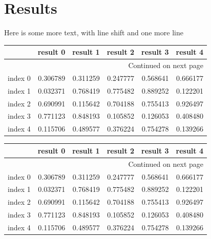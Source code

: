 \documentclass[a4paper]{article}%
\begin{document}
\section{Results}%
\label{sec:Results}%
Here is some more text, \newline%
with line shift\newline%
\newline%
and one more line%
\begin{table}[H]%
\begin{longtable}{lrrrrr}
\toprule
{} &  result 0 &  result 1 &  result 2 &  result 3 &  result 4 \\
\midrule
\endhead
\midrule
\multicolumn{6}{r}{{Continued on next page}} \\
\midrule
\endfoot

\bottomrule
\endlastfoot
index 0 &  0.306789 &  0.311259 &  0.247777 &  0.568641 &  0.666177 \\
index 1 &  0.032371 &  0.768419 &  0.775482 &  0.889252 &  0.122201 \\
index 2 &  0.690991 &  0.115642 &  0.704188 &  0.755413 &  0.926497 \\
index 3 &  0.771123 &  0.848193 &  0.105852 &  0.126053 &  0.408480 \\
index 4 &  0.115706 &  0.489577 &  0.376224 &  0.754278 &  0.139266 \\
\end{longtable}
%
\end{table}%
\begin{table}[H]%
\begin{longtable}{lrrrrr}
\toprule
{} &  result 0 &  result 1 &  result 2 &  result 3 &  result 4 \\
\midrule
\endhead
\midrule
\multicolumn{6}{r}{{Continued on next page}} \\
\midrule
\endfoot

\bottomrule
\endlastfoot
index 0 &  0.306789 &  0.311259 &  0.247777 &  0.568641 &  0.666177 \\
index 1 &  0.032371 &  0.768419 &  0.775482 &  0.889252 &  0.122201 \\
index 2 &  0.690991 &  0.115642 &  0.704188 &  0.755413 &  0.926497 \\
index 3 &  0.771123 &  0.848193 &  0.105852 &  0.126053 &  0.408480 \\
index 4 &  0.115706 &  0.489577 &  0.376224 &  0.754278 &  0.139266 \\
\end{longtable}
%
\end{table}
\end{document}
